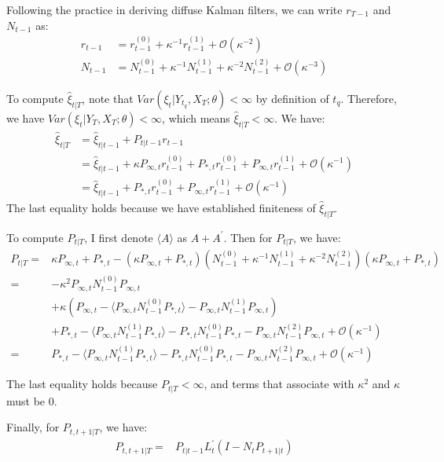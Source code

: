 \documentclass[12pt]{article}
\numberwithin{equation}{section}
\begin{document}
Following the practice in deriving diffuse Kalman filters, we can write $r_{T-1}$ and $N_{t-1}$ as: 
\begin{align*}
    r_{t-1} &= r_{t-1}^{(0)} + \kappa^{-1}r_{t-1}^{(1)} + \mathcal{O}(\kappa^{-2}) \\
    N_{t-1} &= N_{t-1}^{(0)} + \kappa^{-1}N_{t-1}^{(1)} + \kappa^{-2}N_{t-1}^{(2)} + \mathcal{O}(\kappa^{-3})
\end{align*}

To compute $\hat{\xi}_{t|T}$, note that $Var(\xi_t|Y_{t_q},X_T;\theta)<\infty$ by definition of $t_q$. Therefore, we have $Var(\xi_t|Y_T,X_T;\theta)<\infty$, which means $\hat{\xi}_{t|T}<\infty$. We have:
\begin{align*}
    \hat{\xi}_{t|T} &= \hat{\xi}_{t|t-1} + P_{t|t-1}r_{t-1} \\
    &= \hat{\xi}_{t|t-1} + \kappa P_{\infty,t}r_{t-1}^{(0)}+P_{*,t}r_{t-1}^{(0)}+P_{\infty,t}r_{t-1}^{(1)}+\mathcal{O}(\kappa^{-1}) \\
    &= \hat{\xi}_{t|t-1} + P_{*,t}r_{t-1}^{(0)}+P_{\infty,t}r_{t-1}^{(1)}+\mathcal{O}(\kappa^{-1})
\end{align*}
The last equality holds because we have established finiteness of $\hat{\xi}_{t|T}$. 

To compute $P_{t|T}$, I first denote $\langle A\rangle$ as $A+A^{'}$. Then for $P_{t|T}$, we have:
\begin{align*}
    P_{t|T} =& \kappa P_{\infty,t} + P_{*,t} - (\kappa P_{\infty,t} + P_{*,t})(N_{t-1}^{(0)}+\kappa^{-1}N_{t-1}^{(1)}+ \kappa^{-2}N_{t-1}^{(2)})(\kappa P_{\infty,t} + P_{*,t}) \\
    =& -\kappa^2P_{\infty,t}N_{t-1}^{(0)}P_{\infty,t} \\
    &+ \kappa (P_{\infty,t} - \langle P_{\infty,t}N_{t-1}^{(0)}P_{*,t}\rangle - P_{\infty,t}N_{t-1}^{(1)}P_{\infty,t}) \\
    &+ P_{*,t} - \langle P_{\infty,t}N_{t-1}^{(1)}P_{*,t}\rangle - P_{*,t}N_{t-1}^{(0)}P_{*,t} 
        - P_{\infty,t}N_{t-1}^{(2)}P_{\infty,t} + \mathcal{O}(\kappa^{-1}) \\
    =& P_{*,t} - \langle P_{\infty,t}N_{t-1}^{(1)}P_{*,t}\rangle - P_{*,t}N_{t-1}^{(0)}P_{*,t} 
        - P_{\infty,t}N_{t-1}^{(2)}P_{\infty,t} + \mathcal{O}(\kappa^{-1}) 
\end{align*}

The last equality holds because  $P_{t|T}<\infty$, and terms that associate with $\kappa^{2}$ and $\kappa$ must be $0$.

Finally, for $P_{t,t+1|T}$, we have:
\begin{align*}
    P_{t,t+1|T} =& P_{t|t-1}L_t^{'}(I-N_tP_{t+1|t})
\end{align*}
\end{document}

